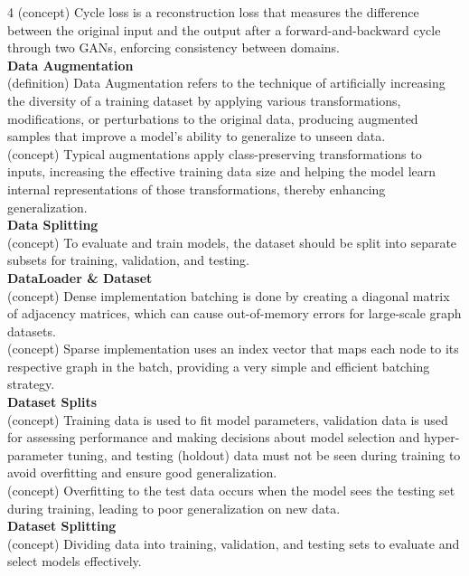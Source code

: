 \documentclass[8pt]{extarticle}
\begin{document}
\begin{multicols}{4}
(concept) Cycle loss is a reconstruction loss that measures the difference between the original input and the output after a forward-and-backward cycle through two GANs, enforcing consistency between domains.\\
\vspace{2pt}\textbf{Data Augmentation}\\
(definition) Data Augmentation refers to the technique of artificially increasing the diversity of a training dataset by applying various transformations, modifications, or perturbations to the original data, producing augmented samples that improve a model's ability to generalize to unseen data.\\
(concept) Typical augmentations apply class-preserving transformations to inputs, increasing the effective training data size and helping the model learn internal representations of those transformations, thereby enhancing generalization.\\
\vspace{2pt}\textbf{Data Splitting}\\
(concept) To evaluate and train models, the dataset should be split into separate subsets for training, validation, and testing.\\
\vspace{2pt}\textbf{DataLoader \& Dataset}\\
(concept) Dense implementation batching is done by creating a diagonal matrix of adjacency matrices, which can cause out-of-memory errors for large-scale graph datasets.\\
(concept) Sparse implementation uses an index vector that maps each node to its respective graph in the batch, providing a very simple and efficient batching strategy.\\
\vspace{2pt}\textbf{Dataset Splits}\\
(concept) Training data is used to fit model parameters, validation data is used for assessing performance and making decisions about model selection and hyper-parameter tuning, and testing (holdout) data must not be seen during training to avoid overfitting and ensure good generalization.\\
(concept) Overfitting to the test data occurs when the model sees the testing set during training, leading to poor generalization on new data.\\
\vspace{2pt}\textbf{Dataset Splitting}\\
(concept) Dividing data into training, validation, and testing sets to evaluate and select models effectively.\\

\end{multicols}
\end{document}
